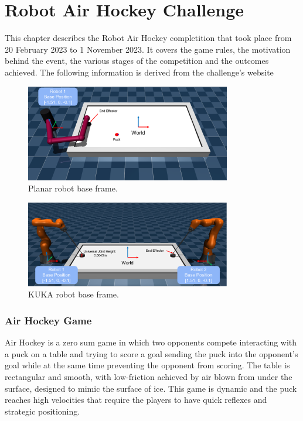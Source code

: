 \chapter{Robot Air Hockey Challenge}
\label{ch:robot_air_hockey_challenge}
This chapter describes the Robot Air Hockey completition that took place from 20 February 2023 to 1 November 2023.
It covers the game rules, the motivation behind the event, the various stages of the competition and the outcomes achieved.
The following information is derived from the challenge's website \cite{air_hockey_competition}%

\begin{figure}[h]
    \centering
    \includegraphics[width=0.8\textwidth]{Images/3dof_planar_env.png}
    \caption{Planar robot base frame.}
    \label{fig:planar_env}
\end{figure}


\begin{figure}[h]
    \centering
    \includegraphics[width=0.8\textwidth]{Images/kuka_env.png}
    \caption{KUKA robot base frame.}
    \label{fig:kuka_env}
\end{figure}

\subsection{Air Hockey Game}
Air Hockey is a zero sum game in which two opponents compete interacting with a puck on a table and trying to score a goal
sending the puck into the opponent's goal while at the same time preventing the opponent from scoring.
The table is rectangular and smooth, with low-friction achieved by air blown from under the surface, designed to mimic the surface of ice.
This game is dynamic and the puck reaches high velocities that require the players to have quick reflexes and strategic positioning.

